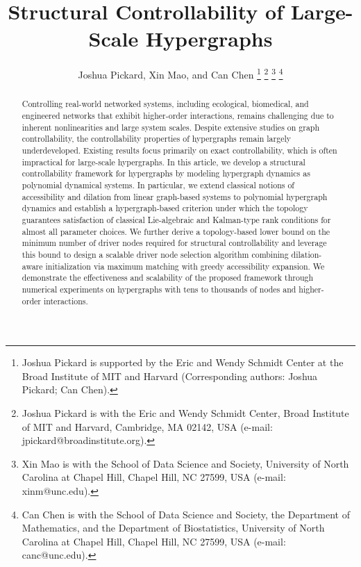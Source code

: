 \documentclass[journal,twoside,web]{ieeecolor}
\begin{document}
\title{\fontsize{22}{20}\selectfont Structural Controllability of Large-Scale Hypergraphs}
\author{Joshua Pickard, Xin Mao, and Can Chen
\thanks{Joshua Pickard is supported by the Eric and Wendy Schmidt Center at the Broad Institute of MIT and Harvard  (Corresponding authors: Joshua
Pickard; Can Chen).}
\thanks{Joshua Pickard is with the Eric and Wendy Schmidt Center, Broad Institute of MIT and Harvard, Cambridge, MA 02142, USA (e-mail: jpickard@broadinstitute.org).}
\thanks{Xin Mao is with the School of Data Science and Society, University of North Carolina at Chapel Hill, Chapel Hill, NC 27599, USA (e-mail: xinm@unc.edu).}
\thanks{Can Chen is with the School of Data Science and Society, the Department of Mathematics, and the Department of Biostatistics, University of North Carolina at Chapel Hill, Chapel Hill, NC 27599, USA (e-mail: canc@unc.edu).}}

\maketitle
\thispagestyle{empty}
\pagestyle{empty}



\begin{abstract}
    Controlling real-world networked systems, including ecological, biomedical, and engineered networks that exhibit higher-order interactions, remains challenging due to inherent nonlinearities and large system scales. Despite extensive studies on graph controllability, the controllability properties of hypergraphs remain largely underdeveloped. Existing results  focus primarily on exact controllability, which is often impractical for large-scale hypergraphs. In this article, we develop a structural controllability framework for hypergraphs by modeling hypergraph dynamics as polynomial dynamical systems. In particular, we extend classical notions of accessibility and dilation from linear graph-based systems to polynomial hypergraph dynamics and establish a hypergraph-based criterion under which the topology guarantees satisfaction of classical Lie-algebraic and Kalman-type rank conditions for almost all parameter choices. We further derive a topology-based lower bound on the minimum number of driver nodes required for structural controllability and leverage this bound to design a scalable driver node selection algorithm combining dilation-aware initialization via maximum matching with greedy accessibility expansion. We demonstrate the effectiveness and scalability of the proposed framework through numerical experiments on hypergraphs with tens to thousands of nodes and higher-order interactions.
\end{abstract}
\end{document}
